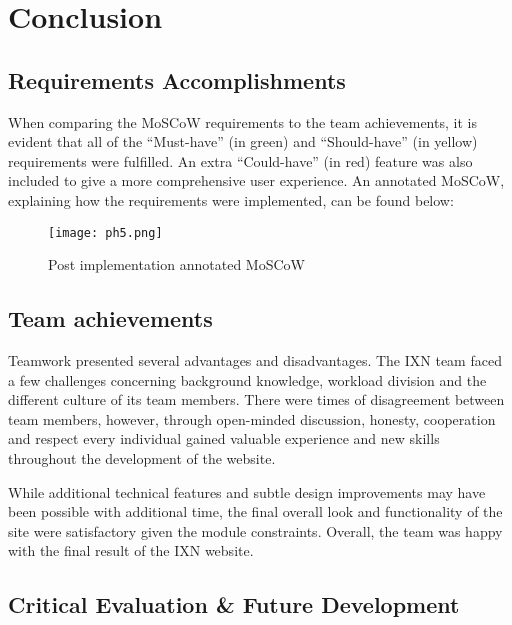 \documentclass[fontsize=10pt]{extarticle}
\numberwithin{figure}{section} %
\begin{document}
\hypertarget{conclusion}{%
\section{Conclusion}\label{conclusion}}

\hypertarget{requirements-accomplishments}{%
\subsection{Requirements
Accomplishments}\label{requirements-accomplishments}}

When comparing the MoSCoW requirements to the team achievements, it is
evident that all of the ``Must-have'' (in green) and ``Should-have'' (in
yellow) requirements were fulfilled. An extra ``Could-have'' (in red)
feature was also included to give a more comprehensive user experience.
An annotated MoSCoW, explaining how the requirements were implemented,
can be found below:

\begin{figure}[H]
      \centering
      \texttt{[image: ph5.png]}
      \caption{Post implementation annotated MoSCoW}
 \end{figure}

\hypertarget{team-achievements}{%
\subsection{Team achievements}\label{team-achievements}}

Teamwork presented several advantages and disadvantages. The IXN team
faced a few challenges concerning background knowledge, workload
division and the different culture of its team members. There were times
of disagreement between team members, however, through open-minded
discussion, honesty, cooperation and respect every individual gained
valuable experience and new skills throughout the development of the
website.

While additional technical features and subtle design improvements may
have been possible with additional time, the final overall look and
functionality of the site were satisfactory given the module
constraints. Overall, the team was happy with the final result of the
IXN website.

\hypertarget{critical-evaluation-future-development}{%
\subsection{Critical Evaluation \& Future
Development}\label{critical-evaluation-future-development}}
\end{document}
